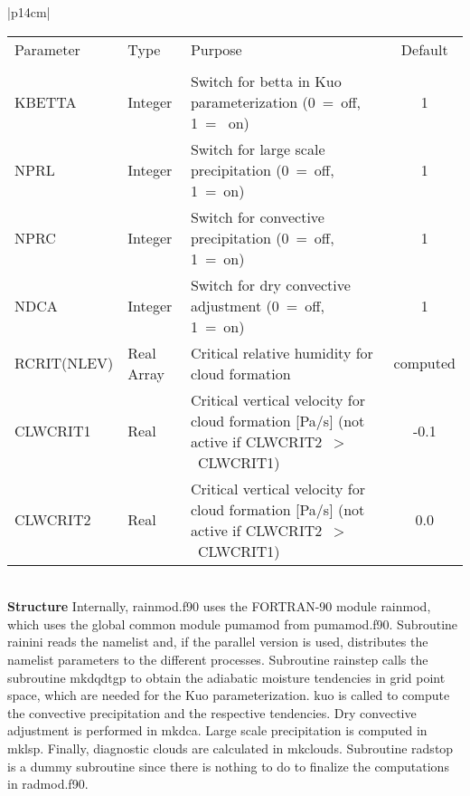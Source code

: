 \begin{center}
\begin{tabular}{|p{14cm}|}
\begin{center}
\begin{tabular}{l l p{5cm} c}  %
Parameter & Type & Purpose & Default \\
&&&\\
KBETTA & Integer & Switch for betta in Kuo parameterization (0~=~off, 1~=~ on) & 1 \\
NPRL & Integer &Switch for large scale precipitation (0~=~off, 1~=~on) & 1 \\
NPRC & Integer &Switch for convective  precipitation (0~=~off, 1~=~on) & 1 \\
NDCA & Integer &Switch for dry convective adjustment (0~=~off, 1~=~on) & 1 \\
RCRIT(NLEV) & Real Array & Critical relative humidity for cloud formation & computed \\
CLWCRIT1 & Real & Critical vertical velocity for cloud formation [Pa/s] (not active if
CLWCRIT2~$>$~CLWCRIT1) & -0.1 \\
CLWCRIT2 & Real & Critical vertical velocity for cloud formation [Pa/s] (not active if
CLWCRIT2~$>$~CLWCRIT1) & 0.0
\end{tabular} 
\end{center}
\vspace{3mm} \\
\hline
\vspace{2mm} {\bf Structure} Internally, {\module rainmod.f90} uses the FORTRAN-90
module {\modu rainmod}, which uses the global common module {\modu pumamod} from
{\module pumamod.f90}. Subroutine {\sub rainini} reads the namelist and, if the parallel
version is used,  distributes the namelist parameters to the different processes. Subroutine
{\sub
rainstep} calls the subroutine {\sub mkdqdtgp} to obtain the adiabatic moisture tendencies in
grid point space, which are needed for the Kuo parameterization. {\sub kuo} is called to
compute the convective precipitation and the respective tendencies. Dry convective
adjustment
is performed in {\sub mkdca}. Large scale precipitation is computed in {\sub mklsp}. Finally,
diagnostic clouds are calculated in {\sub mkclouds}. Subroutine {\sub radstop} is a
dummy subroutine since there is nothing to do to finalize the computations in {\module
radmod.f90}. \vspace{3mm} \\
\hline
\end{tabular}
\end{center}
\newpage


